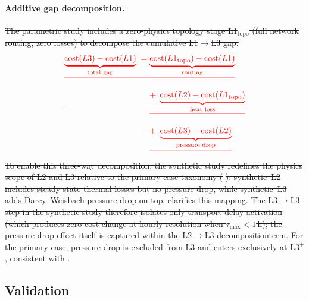 \documentclass[a4paper,fleqn]{cas-sc} %
\providecommand{\DIFdel}[1]{{\protect\color{red}\sout{#1}}} %
\providecommand{\DIFaddbegin}{} %
\providecommand{\DIFaddend}{} %
\providecommand{\DIFdelbegin}{} %
\providecommand{\DIFdelend}{} %
\providecommand{\Lplus}{\ensuremath{\mathrm{L3^{+}}}}
\providecommand{\Cref}[1]{\ref{#1}}
\begin{document}
\DIFdelbegin \paragraph{\DIFdel{Additive gap decomposition.}}
\addtocounter{paragraph}{-1}%
\DIFdel{The parametric study includes a zero-physics topology stage
L1$_{\mathrm{topo}}$ (full network routing, zero losses) to decompose the cumulative L1$\to$L3 gap: %
}\begin{displaymath}
\DIFdel{\label{eq:cost_decomposition}
}\begin{split}
  \DIFdel{\underbrace{\mathrm{cost}(L3) - \mathrm{cost}(L1)}_{\text{total gap}}
  \;=\;}&
  \DIFdel{\underbrace{\mathrm{cost}(L1_{\mathrm{topo}}) - \mathrm{cost}(L1)}_{\text{routing}} }\\[6pt]
  &\DIFdel{+\;
  \underbrace{\mathrm{cost}(L2) - \mathrm{cost}(L1_{\mathrm{topo}})}_{\text{heat loss}} }\\[6pt]
  &\DIFdel{+\;
  \underbrace{\mathrm{cost}(L3) - \mathrm{cost}(L2)}_{\text{pressure drop}}
}\end{split}
\DIFdel{}\end{displaymath}%
\DIFdel{To enable this three-way decomposition, the synthetic study
redefines the physics scope of L2 and L3 relative to the
primary-case taxonomy (}%
\DIFdel{): synthetic~L2
includes steady-state thermal losses but no pressure drop, while synthetic~L3 adds Darcy--Weisbach pressure drop on top.
}%
\DIFdel{clarifies this mapping.
The L3$\to\Lplus$ step in the synthetic study therefore
isolates only transport-delay activation (which produces zero
cost change at hourly resolution when
$\tau_{\max} < 1$\,h); the pressure-drop effect itself is
captured within the L2$\to$L3 decompositionterm. For the
primary case, pressure drop is excluded from L3 and enters
exclusively at $\Lplus$, consistent with
}%
\DIFdel{. }\DIFdelend \DIFaddbegin \subsection{Validation}\label{subsec:validation}
\DIFaddend 
\end{document}
